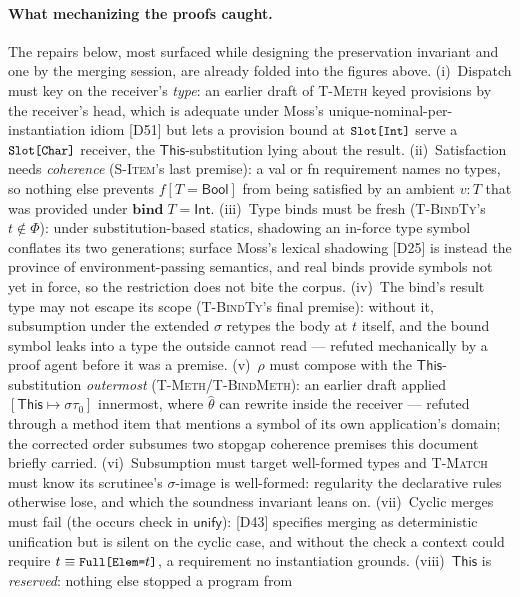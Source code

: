 \documentclass[10pt]{article}
\newcommand{\kw}[1]{\mathbf{#1}}          %
\newcommand{\ksf}[1]{\mathsf{#1}}         %
\newcommand{\This}{\ksf{This}}
\newcommand{\thh}{\hat\theta}
\newcommand{\smallcode}[1]{\texttt{\small #1}}
\theoremstyle{plain}
\theoremstyle{remark}
\begin{document}
\paragraph{What mechanizing the proofs caught.}
The repairs below, most surfaced while designing the preservation
invariant and one by the merging session, are already folded into the
figures above. (i)~Dispatch must key on the
receiver's \emph{type}: an earlier draft of \textsc{T-Meth} keyed
provisions by the receiver's head, which is adequate under Moss's
unique-nominal-per-instantiation idiom [D51] but lets a provision bound
at $\smallcode{Slot[Int]}$ serve a $\smallcode{Slot[Char]}$ receiver,
the $\This$-substitution lying about the result.
(ii)~Satisfaction needs \emph{coherence} (\textsc{S-Item}'s last
premise): a val or fn requirement names no types, so nothing else
prevents $f[T{=}\ksf{Bool}]$ from being satisfied by an ambient
$v : T$ that was provided under $\kw{bind}\;T{=}\ksf{Int}$.
(iii)~Type binds must be fresh (\textsc{T-BindTy}'s $t \notin \Phi$):
under substitution-based statics, shadowing an in-force type symbol
conflates its two generations; surface Moss's lexical shadowing [D25]
is instead the province of environment-passing semantics, and real
binds provide symbols not yet in force, so the restriction does not
bite the corpus.
(iv)~The bind's result type may not escape its scope
(\textsc{T-BindTy}'s final premise): without it, subsumption under the
extended $\sigma$ retypes the body at $t$ itself, and the bound symbol
leaks into a type the outside cannot read --- refuted mechanically by a
proof agent before it was a premise.
(v)~$\rho$ must compose with the $\This$-substitution \emph{outermost}
(\textsc{T-Meth}/\textsc{T-BindMeth}): an earlier draft applied
$[\This \mapsto \sigma\tau_0]$ innermost, where $\thh$ can rewrite
inside the receiver --- refuted through a method item that mentions a
symbol of its own application's domain; the corrected order subsumes
two stopgap coherence premises this document briefly carried.
(vi)~Subsumption must target well-formed types and \textsc{T-Match}
must know its scrutinee's $\sigma$-image is well-formed: regularity the
declarative rules otherwise lose, and which the soundness invariant
leans on.
(vii)~Cyclic merges must fail (the occurs check in
$\ksf{unify}$): [D43] specifies merging as deterministic unification but is
silent on the cyclic case, and without the check a context could require
$t \equiv \smallcode{Full[Elem=}t\smallcode{]}$, a requirement no
instantiation grounds.
(viii)~$\This$ is \emph{reserved}: nothing else stopped a program from
\end{document}
